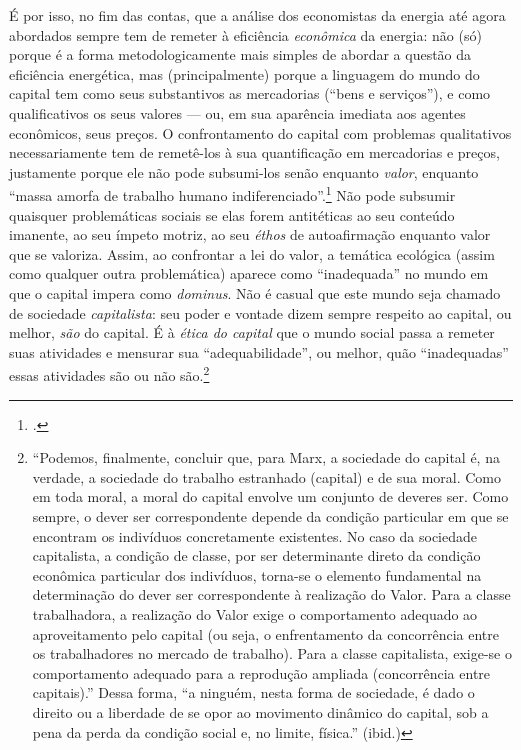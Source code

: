 É por isso, no fim das contas, que a análise dos economistas da energia até agora abordados sempre tem de remeter à eficiência \emph{econômica} da energia: não (só) porque é a forma metodologicamente mais simples de abordar a questão da eficiência energética, mas (principalmente) porque a linguagem do mundo do capital tem como seus substantivos as mercadorias (``bens e serviços''), e como qualificativos os seus valores --- ou, em sua aparência imediata aos agentes econômicos, seus preços. O confrontamento do capital com problemas qualitativos necessariamente tem de remetê-los à sua quantificação em mercadorias e preços, justamente porque ele não pode subsumi-los senão enquanto \emph{valor}, enquanto ``massa amorfa de trabalho humano indiferenciado''.\footnote{\textcite[p. 116]{Marx2017}.}  Não pode subsumir quaisquer problemáticas sociais se elas forem antitéticas ao seu conteúdo imanente, ao seu ímpeto motriz, ao seu \emph{éthos} de autoafirmação enquanto valor que se valoriza. Assim, ao confrontar a lei do valor, a temática ecológica (assim como qualquer outra problemática) aparece como ``inadequada'' no mundo em que o capital impera como \emph{dominus}. Não é casual que este mundo seja chamado de sociedade \emph{capitalista}: seu poder e vontade dizem sempre respeito ao capital, ou melhor, \emph{são} do capital. É à \emph{ética do capital} que o mundo social passa a remeter suas atividades e mensurar sua ``adequabilidade'', ou melhor, quão ``inadequadas'' essas atividades são ou não são.\footnote{``Podemos, finalmente, concluir que, para Marx, a sociedade do capital é, na verdade, a sociedade do trabalho estranhado (capital) e de sua moral. Como em toda moral, a moral do capital envolve um conjunto de deveres ser. Como sempre, o dever ser correspondente depende da condição particular em que se encontram os indivíduos concretamente existentes. No caso da sociedade capitalista, a condição de classe, por ser determinante direto da condição econômica particular dos indivíduos, torna-se o elemento fundamental na determinação do dever ser correspondente à realização do Valor. Para a classe trabalhadora, a realização do Valor exige o comportamento adequado ao aproveitamento pelo capital (ou seja, o enfrentamento da concorrência entre os trabalhadores no mercado de trabalho). Para a classe capitalista, exige-se o comportamento adequado para a reprodução ampliada (concorrência entre capitais).'' \parencite[p. 330]{Medeiros2013a} Dessa forma, ``a ninguém, nesta forma de sociedade, é dado o direito ou a liberdade de se opor ao movimento dinâmico do capital, sob a pena da perda da condição social e, no limite, física.'' (ibid.)}

